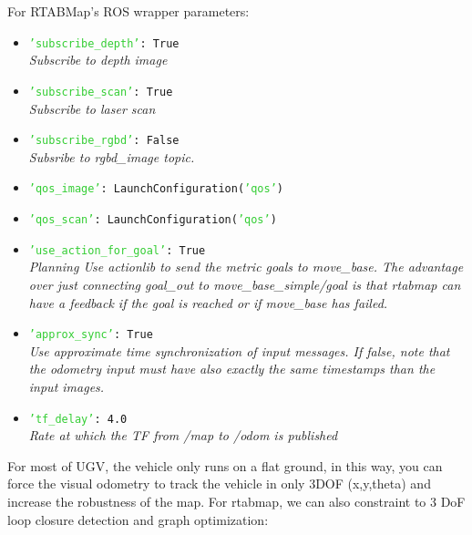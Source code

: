 For RTABMap's ROS wrapper parameters:
\begin{itemize}
    \item \texttt{\textcolor{LimeGreen}{'subscribe\_depth'}: \textcolor{NavyBlue}{True}}\\
    \textit{Subscribe to depth image}
    \item \texttt{\textcolor{LimeGreen}{'subscribe\_scan'}: \textcolor{NavyBlue}{True}}\\
    \textit{Subscribe to laser scan}
    \item \texttt{\textcolor{LimeGreen}{'subscribe\_rgbd'}: \textcolor{NavyBlue}{False}}\\
    \textit{Subsribe to rgbd\_image topic.}
    \item \texttt{\textcolor{LimeGreen}{'qos\_image'}: LaunchConfiguration(\textcolor{LimeGreen}{'qos'})}
    \item \texttt{\textcolor{LimeGreen}{'qos\_scan'}: LaunchConfiguration(\textcolor{LimeGreen}{'qos'})}
    \item \texttt{\textcolor{LimeGreen}{'use\_action\_for\_goal'}: \textcolor{NavyBlue}{True}}\\
    \textit{Planning Use actionlib to send the metric goals to move\_base. The advantage over just connecting goal\_out to move\_base\_simple/goal is that rtabmap can have a feedback if the goal is reached or if move\_base has failed.}
    \item \texttt{\textcolor{LimeGreen}{'approx\_sync'}: \textcolor{NavyBlue}{True}}\\
    \textit{Use approximate time synchronization of input messages. If false, note that the odometry input must have also exactly the same timestamps than the input images.}
    \item \texttt{\textcolor{LimeGreen}{'tf\_delay'}: \textcolor{NavyBlue}{4.0}}\\
    \textit{Rate at which the TF from /map to /odom is published}
\end{itemize}

For most of UGV, the vehicle only runs on a flat ground, in this way, you can force the visual odometry to track the vehicle in only 3DOF (x,y,theta) and increase the robustness of the map. For rtabmap, we can also constraint to 3 DoF loop closure detection and graph optimization:

